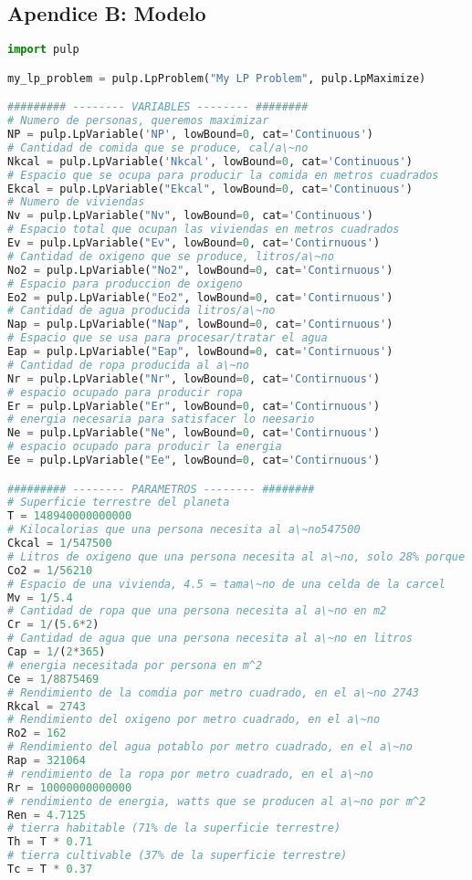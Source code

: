 \documentclass[12pt]{report}
\begin{document}
\subsection*{Apendice B: Modelo}
\begin{lstlisting}[language=Python, frame=single, basicstyle=\tiny]
import pulp

my_lp_problem = pulp.LpProblem("My LP Problem", pulp.LpMaximize)

######### -------- VARIABLES -------- ########
# Numero de personas, queremos maximizar
NP = pulp.LpVariable('NP', lowBound=0, cat='Continuous')
# Cantidad de comida que se produce, cal/a\~no
Nkcal = pulp.LpVariable('Nkcal', lowBound=0, cat='Continuous')
# Espacio que se ocupa para producir la comida en metros cuadrados
Ekcal = pulp.LpVariable("Ekcal", lowBound=0, cat='Continuous')
# Numero de viviendas
Nv = pulp.LpVariable("Nv", lowBound=0, cat='Continuous')
# Espacio total que ocupan las viviendas en metros cuadrados
Ev = pulp.LpVariable("Ev", lowBound=0, cat='Contirnuous')
# Cantidad de oxigeno que se produce, litros/a\~no
No2 = pulp.LpVariable("No2", lowBound=0, cat='Contirnuous')
# Espacio para produccion de oxigeno
Eo2 = pulp.LpVariable("Eo2", lowBound=0, cat='Contirnuous')
# Cantidad de agua producida litros/a\~no
Nap = pulp.LpVariable("Nap", lowBound=0, cat='Contirnuous')
# Espacio que se usa para procesar/tratar el agua
Eap = pulp.LpVariable("Eap", lowBound=0, cat='Contirnuous')
# Cantidad de ropa producida al a\~no
Nr = pulp.LpVariable("Nr", lowBound=0, cat='Contirnuous')
# espacio ocupado para producir ropa
Er = pulp.LpVariable("Er", lowBound=0, cat='Contirnuous')
# energia necesaria para satisfacer lo neesario
Ne = pulp.LpVariable("Ne", lowBound=0, cat='Contirnuous')
# espacio ocupado para producir la energia
Ee = pulp.LpVariable("Ee", lowBound=0, cat='Contirnuous')

######### -------- PARAMETROS -------- ########
# Superficie terrestre del planeta
T = 148940000000000
# Kilocalorias que una persona necesita al a\~no547500
Ckcal = 1/547500
# Litros de oxigeno que una persona necesita al a\~no, solo 28% porque el otro 72 viene de algas marinas
Co2 = 1/56210
# Espacio de una vivienda, 4.5 = tama\~no de una celda de la carcel
Mv = 1/5.4
# Cantidad de ropa que una persona necesita al a\~no en m2
Cr = 1/(5.6*2)
# Cantidad de agua que una persona necesita al a\~no en litros
Cap = 1/(2*365)
# energia necesitada por persona en m^2
Ce = 1/8875469
# Rendimiento de la comdia por metro cuadrado, en el a\~no 2743
Rkcal = 2743
# Rendimiento del oxigeno por metro cuadrado, en el a\~no
Ro2 = 162
# Rendimiento del agua potablo por metro cuadrado, en el a\~no
Rap = 321064
# rendimiento de la ropa por metro cuadrado, en el a\~no
Rr = 10000000000000
# rendimiento de energia, watts que se producen al a\~no por m^2
Ren = 4.7125
# tierra habitable (71% de la superficie terrestre)
Th = T * 0.71
# tierra cultivable (37% de la superficie terrestre)
Tc = T * 0.37


\end{lstlisting}
\end{document}
